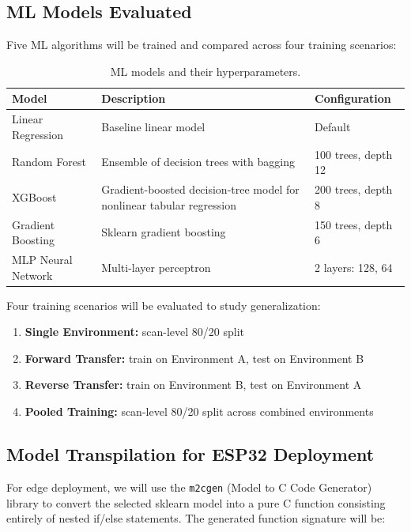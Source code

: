 \documentclass[12pt,a4paper]{article}
\begin{document}
    \subsection{ML Models Evaluated}

    Five ML algorithms will be trained and compared across four training scenarios:

    \begin{table}[H]
    \centering
    \caption{ML models and their hyperparameters.}
    \label{tab:models}
    \begin{tabularx}{\textwidth}{|p{1.5in}|X|p{1.4in}|}
    \hline
    \textbf{Model} & \textbf{Description} & \textbf{Configuration} \\
    \hline
    Linear Regression & Baseline linear model & Default \\
    \hline
    Random Forest & Ensemble of decision trees with bagging & 100 trees, depth 12 \\
    \hline
    XGBoost & Gradient-boosted decision-tree model for nonlinear tabular regression & 200 trees, depth 8 \\
    \hline
    Gradient Boosting & Sklearn gradient boosting & 150 trees, depth 6 \\
    \hline
    MLP Neural Network & Multi-layer perceptron & 2 layers: 128, 64 \\
    \hline
    \end{tabularx}
    \end{table}

    Four training scenarios will be evaluated to study generalization:
    \begin{enumerate}[leftmargin=0.35in]
        \item \textbf{Single Environment:} scan-level 80/20 split
        \item \textbf{Forward Transfer:} train on Environment A, test on Environment B
        \item \textbf{Reverse Transfer:} train on Environment B, test on Environment A
        \item \textbf{Pooled Training:} scan-level 80/20 split across combined environments
    \end{enumerate}


    \subsection{Model Transpilation for ESP32 Deployment}

    For edge deployment, we will use the \texttt{m2cgen} (Model to C Code Generator) library to convert the selected sklearn model into a pure C function consisting entirely of nested if/else statements. The generated function signature will be:
\end{document}
